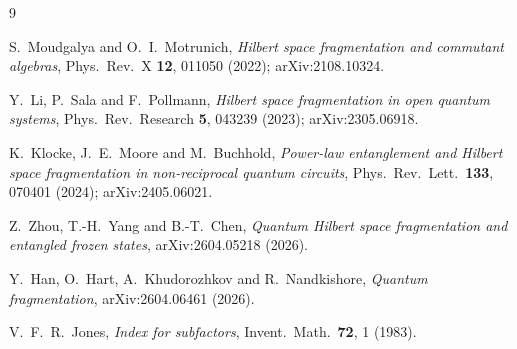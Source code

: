 \documentclass[11pt]{article}
\theoremstyle{plain}
\theoremstyle{remark}
\begin{document}
\begin{thebibliography}{9}

 S.~Moudgalya and O.~I.~Motrunich,
  \emph{Hilbert space fragmentation and commutant algebras},
  Phys.\ Rev.\ X \textbf{12}, 011050 (2022); arXiv:2108.10324.

 Y.~Li, P.~Sala and F.~Pollmann,
  \emph{Hilbert space fragmentation in open quantum systems},
  Phys.\ Rev.\ Research \textbf{5}, 043239 (2023); arXiv:2305.06918.

 K.~Klocke, J.~E.~Moore and M.~Buchhold,
  \emph{Power-law entanglement and Hilbert space fragmentation in non-reciprocal
  quantum circuits},
  Phys.\ Rev.\ Lett.\ \textbf{133}, 070401 (2024); arXiv:2405.06021.

 Z.~Zhou, T.-H.~Yang and B.-T.~Chen,
  \emph{Quantum Hilbert space fragmentation and entangled frozen states},
  arXiv:2604.05218 (2026).

 Y.~Han, O.~Hart, A.~Khudorozhkov and R.~Nandkishore,
  \emph{Quantum fragmentation},
  arXiv:2604.06461 (2026).

 V.~F.~R.~Jones,
  \emph{Index for subfactors},
  Invent.\ Math.\ \textbf{72}, 1 (1983).

\end{thebibliography}
\end{document}
